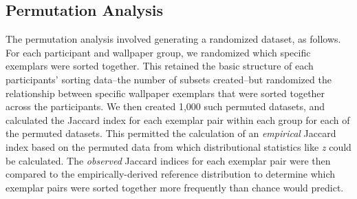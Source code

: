 \documentclass[11pt, twoside]{article}
\begin{document}
\subsection*{Permutation Analysis}
The permutation analysis involved generating a randomized dataset, as follows. For each participant and wallpaper group, we randomized which specific exemplars were sorted together. This retained the basic structure of each participants' sorting data--the number of subsets created--but randomized the relationship between specific wallpaper exemplars that were sorted together across the participants. We then created 1,000 such permuted datasets, and calculated the Jaccard index for each exemplar pair within each group for each of the permuted datasets. This permitted the calculation of an \emph{empirical} Jaccard index based on the permuted data from which distributional statistics like \textit{z} could be calculated. The \emph{observed} Jaccard indices for each exemplar pair were then compared to the empirically-derived reference distribution to determine which exemplar pairs were sorted together more frequently than chance would predict.

\begin{multicols}{2}
\small
 

\end{multicols}
\end{document}
